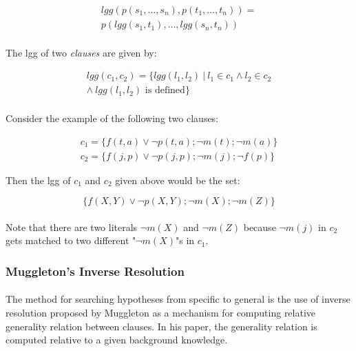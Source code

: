 \documentclass{article}
\theoremstyle{plain}
\theoremstyle{definition}
\begin{document}
\begin{multicols}{2}
\begin{align*}
lgg(p(s_1, \dots, s_n), p(t_1, \dots, t_n)) =\\
	p(lgg(s_1, t_1),\dots,lgg(s_n, t_n))
\end{align*}

\paragraph{}The lgg of two \textit{clauses} are given by:

\begin{align*}
lgg(c_1, c_2) = \{lgg(l_1, l_2)\ |\ l_1 \in c_1 \land l_2 \in c_2 \\
\land\ lgg(l_1, l_2) \text{ is defined}\}
\end{align*} 

\paragraph{} Consider the example of the following two clauses:

\begin{align*}
c_1 = \{f(t,a)\lor\lnot p(t, a); \lnot m(t); \lnot m(a)\}\\
c_2 = \{f(j,p)\lor\lnot p(j, p); \lnot m(j); \lnot f(p)\}
\end{align*} 

\noindent Then the lgg of $c_1$ and $c_2$ given above would be the set:

$$\{f(X,Y) \lor \lnot p(X, Y); \lnot m(X); \lnot m(Z)\}$$

\paragraph{} Note that there are two literals $\lnot m(X)$ and $\lnot m(Z)$ because $\lnot m(j)$ in $c_2$ gets matched to two different "$\lnot m(X)$"s in $c_1$.

\subsubsection{Muggleton's Inverse Resolution}

\paragraph{} The method for searching hypotheses from specific to general is the use of inverse resolution proposed by Muggleton\cite{muggleton95} as a mechanism for computing relative generality relation between clauses. In his paper, the generality relation is computed relative to a given background knowledge.


\end{multicols}
\end{document}
